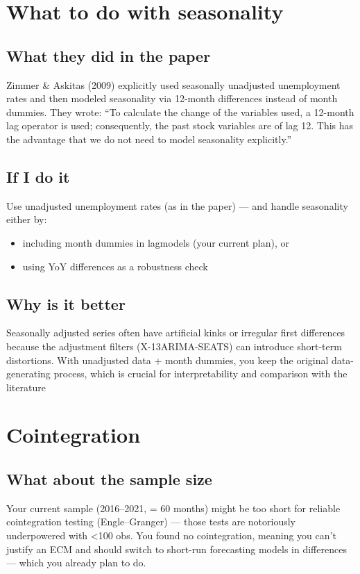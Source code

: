 \documentclass{article}
\begin{document}
\section{What to do with seasonality}

\subsection{What they did in the paper}
Zimmer \& Askitas (2009) explicitly used seasonally unadjusted unemployment rates and then modeled seasonality via 12-month differences instead of month dummies. They wrote:
“To calculate the change of the variables used, a 12-month lag operator is used; consequently, the past stock variables are of lag 12. This has the advantage that we do not need to model seasonality explicitly.”

\subsection{If I do it }
Use unadjusted unemployment rates (as in the paper) — and handle seasonality either by:
\begin{itemize}
    \item including month dummies in lagmodels (your current plan), or
    \item using YoY differences as a robustness check
\end{itemize}

\subsection{Why is it better}
Seasonally adjusted series often have artificial kinks or irregular first differences because the adjustment filters (X-13ARIMA-SEATS) can introduce short-term distortions.
With unadjusted data + month dummies, you keep the original data-generating process, which is crucial for interpretability and comparison with the literature


\section{Cointegration}

\subsection{What about the sample size}
Your current sample (2016–2021, = 60 months) might be too short for reliable cointegration testing (Engle–Granger) — those tests are notoriously underpowered with <100 obs.
You found no cointegration, meaning you can’t justify an ECM and should switch to short-run forecasting models in differences — which you already plan to do.
\end{document}
